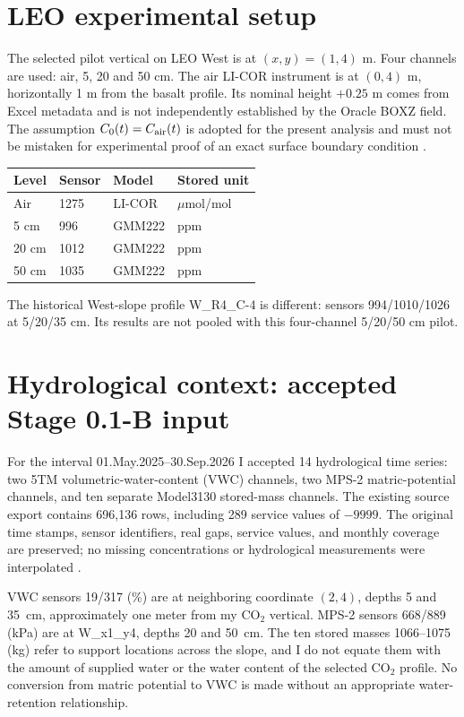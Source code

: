 \documentclass[11pt,letterpaper]{article}
\begin{document}
\section{LEO experimental setup}
\label{sec:setup}
The selected pilot vertical on LEO West is at $(x,y)=(1,4)$ m. Four channels are used: air, 5, 20 and 50 cm. The air LI-COR instrument is at $(0,4)$ m, horizontally 1 m from the basalt profile. Its nominal height $+0.25$ m comes from Excel metadata and is not independently established by the Oracle BOXZ field. The assumption $C_0(t)=C_{\rm air}(t)$ is adopted for the present analysis and must not be mistaken for experimental proof of an exact surface boundary condition \cite{phase,passport}.
\begin{center}
\begin{tabular}{llll}
\toprule
Level & Sensor & Model & Stored unit\\
\midrule
Air & 1275 & LI-COR & $\mu$mol/mol\\
5 cm & 996 & GMM222 & ppm\\
20 cm & 1012 & GMM222 & ppm\\
50 cm & 1035 & GMM222 & ppm\\
\bottomrule
\end{tabular}
\end{center}
The historical West-slope profile W\_R4\_C-4 is different: sensors 994/1010/1026 at 5/20/35 cm. Its results are not pooled with this four-channel 5/20/50 cm pilot.

\section{Hydrological context: accepted Stage 0.1-B input}
\label{sec:hydro}
For the interval 01.May.2025--30.Sep.2026 I accepted
14 hydrological time series: two 5TM volumetric-water-content
(VWC) channels, two MPS-2 matric-potential channels, and ten
separate Model3130 stored-mass channels. The existing source
export contains 696,136 rows, including 289 service values
of $-9999$. The original time stamps, sensor identifiers,
real gaps, service values, and monthly coverage are preserved;
no missing concentrations or hydrological measurements were
interpolated \cite{hydroaudit,hydrovalidation}.

VWC sensors 19/317 (\%) are at neighboring coordinate $(2,4)$,
depths 5 and 35~cm, approximately one meter from my CO$_2$
vertical. MPS-2 sensors 668/889 (kPa) are at W\_x1\_y4,
depths 20 and 50~cm. The ten stored masses 1066--1075 (kg)
refer to support locations across the slope, and I do not
equate them with the amount of supplied water or the water
content of the selected CO$_2$ profile. No conversion from
matric potential to VWC is made without an appropriate
water-retention relationship.
\end{document}

